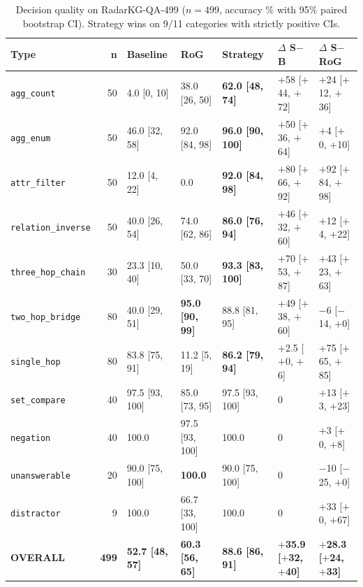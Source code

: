 \documentclass[review]{elsarticle}
\newcommand{\qtype}[1]{\texttt{\small #1}}
\begin{document}
\begin{table}[t]
\centering\small
\caption{Decision quality on RadarKG-QA-499 ($n{=}499$, accuracy \% with 95\%
paired bootstrap CI). Strategy wins on 9/11 categories with strictly positive
CIs.}
\label{tab:main}
\setlength{\tabcolsep}{3.5pt}
\begin{tabular}{l r l l l l l}
\toprule
\textbf{Type} & \textbf{n} & \textbf{Baseline} & \textbf{RoG} & \textbf{Strategy} & \textbf{$\Delta$ S$-$B} & \textbf{$\Delta$ S$-$RoG} \\
\midrule
\qtype{agg\_count}        & 50 & 4.0 [0, 10] & 38.0 [26, 50] & \textbf{62.0 [48, 74]} & $+$58 [$+$44, $+$72] & $+$24 [$+$12, $+$36] \\
\qtype{agg\_enum}         & 50 & 46.0 [32, 58] & 92.0 [84, 98] & \textbf{96.0 [90, 100]} & $+$50 [$+$36, $+$64] & $+$4 [$+$0, $+$10] \\
\qtype{attr\_filter}      & 50 & 12.0 [4, 22]  & 0.0           & \textbf{92.0 [84, 98]} & $+$80 [$+$66, $+$92] & $+$92 [$+$84, $+$98] \\
\qtype{relation\_inverse} & 50 & 40.0 [26, 54] & 74.0 [62, 86] & \textbf{86.0 [76, 94]} & $+$46 [$+$32, $+$60] & $+$12 [$+$4, $+$22] \\
\qtype{three\_hop\_chain} & 30 & 23.3 [10, 40] & 50.0 [33, 70] & \textbf{93.3 [83, 100]} & $+$70 [$+$53, $+$87] & $+$43 [$+$23, $+$63] \\
\qtype{two\_hop\_bridge}  & 80 & 40.0 [29, 51] & \textbf{95.0 [90, 99]} & 88.8 [81, 95] & $+$49 [$+$38, $+$60] & $-$6 [$-$14, $+$0] \\
\qtype{single\_hop}       & 80 & 83.8 [75, 91] & 11.2 [5, 19]  & \textbf{86.2 [79, 94]} & $+$2.5 [$+$0, $+$6] & $+$75 [$+$65, $+$85] \\
\qtype{set\_compare}      & 40 & 97.5 [93, 100] & 85.0 [73, 95] & 97.5 [93, 100] & 0 & $+$13 [$+$3, $+$23] \\
\qtype{negation}          & 40 & 100.0          & 97.5 [93, 100] & 100.0 & 0 & $+$3 [$+$0, $+$8] \\
\qtype{unanswerable}      & 20 & 90.0 [75, 100] & \textbf{100.0} & 90.0 [75, 100] & 0 & $-$10 [$-$25, $+$0] \\
\qtype{distractor}        & 9  & 100.0          & 66.7 [33, 100] & 100.0 & 0 & $+$33 [$+$0, $+$67] \\
\midrule
\textbf{OVERALL} & \textbf{499} & \textbf{52.7 [48, 57]} & \textbf{60.3 [56, 65]} & \textbf{88.6 [86, 91]} & \textbf{$+$35.9 [$+$32, $+$40]} & \textbf{$+$28.3 [$+$24, $+$33]} \\
\bottomrule
\end{tabular}
\end{table}
\end{document}
